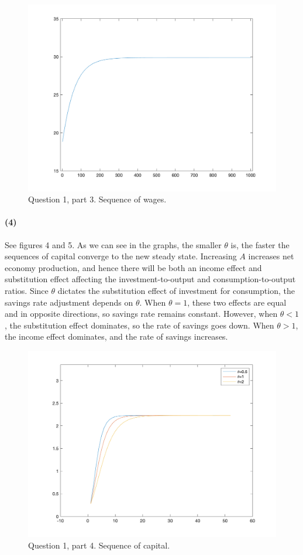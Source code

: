 \documentclass[10pt,letter]{article}
\newcommand{\problempart}[1]{\paragraph{#1}}
\begin{document}
\begin{figure}
\centering
\includegraphics[scale=0.8]{ps1q1fig3}
\caption{Question 1, part 3. Sequence of wages.}
\end{figure}
\problempart{(4)} See figures 4 and 5. As we can see in the graphs, the smaller $\theta$ is, the faster the sequences of capital converge to the new steady state. Increasing $A$ increases net economy production, and hence there will be both an income effect and substitution effect affecting the investment-to-output and consumption-to-output ratios. Since $\theta$ dictates the substitution effect of investment for consumption, the savings rate adjustment depends on $\theta$. When $\theta = 1$, these two effects are equal and in opposite directions, so savings rate remains constant. However, when $\theta < 1$, the substitution effect dominates, so the rate of savings goes down. When $\theta > 1$, the income effect dominates, and the rate of savings increases.
\begin{figure}
\centering
\includegraphics[scale=0.8]{ps1q1fig4}
\caption{Question 1, part 4. Sequence of capital.}
\end{figure}
\end{document}

